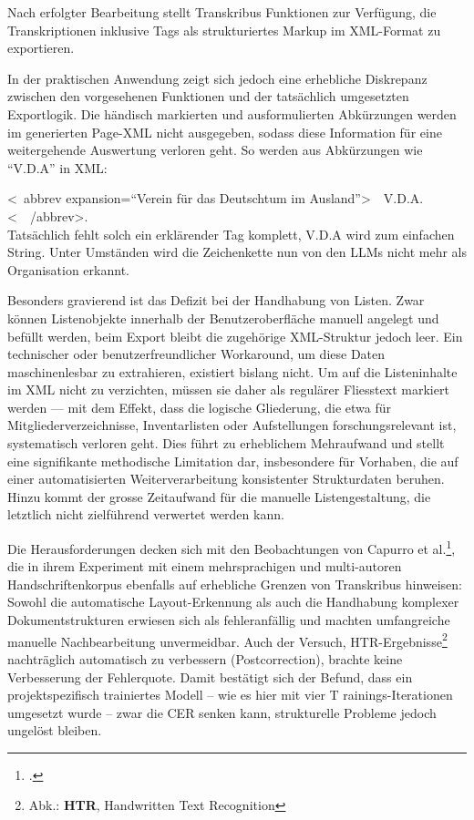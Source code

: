 \documentclass[12pt, a4paper, ngerman, bidi=default]{article}
\let\cite\footcite
\begin{document}
Nach erfolgter Bearbeitung stellt Transkribus Funktionen zur Verfügung, die Transkriptionen inklusive Tags als strukturiertes Markup im XML-Format zu exportieren.

In der praktischen Anwendung zeigt sich jedoch eine erhebliche Diskrepanz zwischen den vorgesehenen Funktionen und der tatsächlich umgesetzten Exportlogik. 
Die händisch markierten und ausformulierten Abkürzungen werden im generierten Page-XML nicht ausgegeben, sodass diese Information 
für eine weitergehende Auswertung verloren geht. So werden aus Abkürzungen wie \enquote{V.D.A} in XML:

\colorbox{VeryLightGray}{\textless~abbrev expansion=\enquote{Verein für das Deutschtum im Ausland}\textgreater\ \ V.D.A.\textless\ \ /abbrev\textgreater}.\\
Tatsächlich fehlt solch ein erklärender Tag komplett, V.D.A wird zum einfachen String. Unter Umständen wird die Zeichenkette nun von den LLMs nicht mehr als Organisation erkannt. 

Besonders gravierend ist das Defizit bei der Handhabung von Listen. Zwar können Listenobjekte innerhalb der
 Benutzeroberfläche manuell angelegt und befüllt werden, beim Export bleibt die zugehörige XML-Struktur jedoch leer. 
 Ein technischer oder benutzerfreundlicher Workaround, um diese Daten maschinenlesbar zu extrahieren, existiert bislang nicht. 
 Um auf die Listeninhalte im XML nicht zu verzichten, müssen sie daher als regulärer Fliesstext markiert werden — 
 mit dem Effekt, dass die logische Gliederung, die etwa für Mitgliederverzeichnisse, Inventarlisten oder Aufstellungen 
 forschungsrelevant ist, systematisch verloren geht. Dies führt zu erheblichem Mehraufwand und stellt eine signifikante methodische 
 Limitation dar, insbesondere für Vorhaben, die auf einer automatisierten Weiterverarbeitung konsistenter Strukturdaten beruhen. 
 Hinzu kommt der grosse Zeitaufwand für die manuelle Listengestaltung, die letztlich nicht zielführend verwertet werden kann.

Die Herausforderungen decken sich mit den Beobachtungen von Capurro et al.\cite[][]{capurro_experimenting_2023}, die in
 ihrem Experiment mit einem mehrsprachigen und multi-autoren Handschriftenkorpus ebenfalls auf erhebliche Grenzen von 
 Transkribus hinweisen: Sowohl die automatische Layout-Erkennung als auch die Handhabung komplexer Dokumentstrukturen erwiesen 
 sich als fehleranfällig und machten umfangreiche manuelle Nachbearbeitung unvermeidbar. Auch der Versuch, 
 HTR-Ergebnisse\footnote{Abk.: \textbf{HTR}, Handwritten Text Recognition} nachträglich automatisch zu verbessern (Postcorrection), 
 brachte keine Verbesserung der Fehlerquote. Damit bestätigt sich der Befund, dass ein projektspezifisch trainiertes Modell – wie es hier mit vier T
 rainings-Iterationen umgesetzt wurde – zwar die CER senken kann, strukturelle Probleme jedoch ungelöst bleiben.
\end{document}
